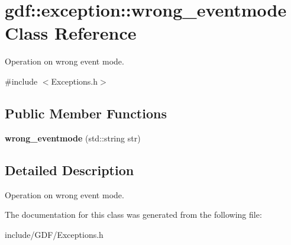 \hypertarget{classgdf_1_1exception_1_1wrong__eventmode}{
\section{gdf::exception::wrong\_\-eventmode Class Reference}
\label{classgdf_1_1exception_1_1wrong__eventmode}
}


Operation on wrong event mode.  




{\ttfamily \#include $<$Exceptions.h$>$}

\subsection*{Public Member Functions}
\begin{DoxyCompactItemize}
\item 
\hypertarget{classgdf_1_1exception_1_1wrong__eventmode_a552a358aa767076ebebf94604d70029b}{
{\bfseries wrong\_\-eventmode} (std::string str)}
\label{classgdf_1_1exception_1_1wrong__eventmode_a552a358aa767076ebebf94604d70029b}

\end{DoxyCompactItemize}


\subsection{Detailed Description}
Operation on wrong event mode. 

The documentation for this class was generated from the following file:\begin{DoxyCompactItemize}
\item 
include/GDF/Exceptions.h\end{DoxyCompactItemize}
